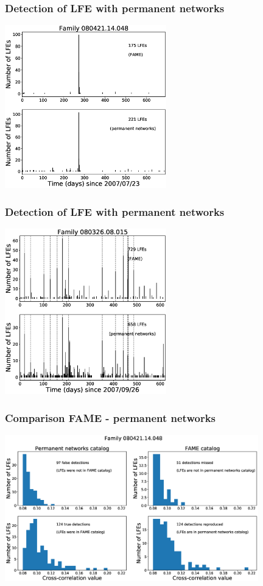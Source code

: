 \documentclass{beamer}
\begin{document}
	\begin{frame}
		\frametitle{Detection of LFE with permanent networks}
		\begin{center}
			\includegraphics[width=7cm, trim={0cm 0cm 0cm 2cm}, clip]{catalog_SC/08042114048_permanent.eps}
		\end{center}
	\end{frame}

	\begin{frame}
		\frametitle{Detection of LFE with permanent networks}
		\begin{center}
			\includegraphics[width=7cm, trim={0cm 0cm 0cm 2cm}, clip]{catalog_SC/08032608015_permanent.eps}
		\end{center}
	\end{frame}

	\begin{frame}
		\frametitle{Comparison FAME - permanent networks}
		\begin{center}
			\includegraphics[width=11cm, trim={0cm 0cm 0cm 0cm}, clip]{catalog_SC/08042114048_comparison.eps}
		\end{center}
	\end{frame}
\end{document}
